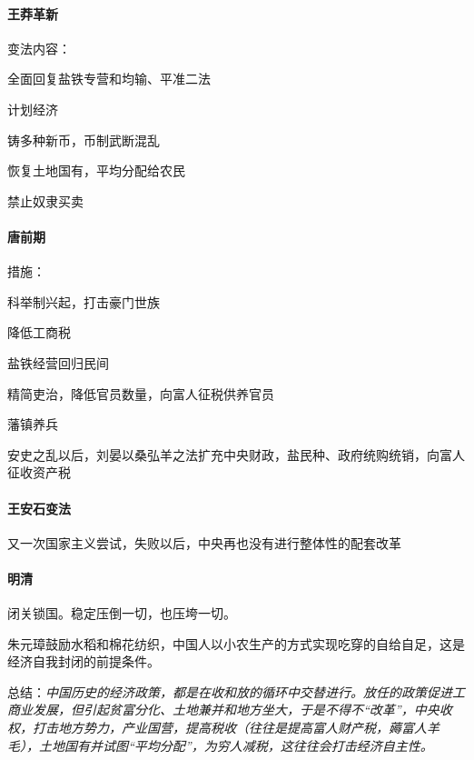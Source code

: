 \paragraph{王莽革新}

变法内容：
\begin{itemize*}
	\item 全面回复盐铁专营和均输、平准二法
	\item 计划经济
	\item 铸多种新币，币制武断混乱
	\item 恢复土地国有，平均分配给农民
	\item 禁止奴隶买卖
\end{itemize*}

\paragraph{唐前期}

措施：
\begin{itemize*}
	\item 科举制兴起，打击豪门世族
	\item 降低工商税
	\item 盐铁经营回归民间
	\item 精简吏治，降低官员数量，向富人征税供养官员
	\item 藩镇养兵
\end{itemize*}
安史之乱以后，刘晏以桑弘羊之法扩充中央财政，盐民种、政府统购统销，向富人征收资产税

\paragraph{王安石变法}

又一次国家主义尝试，失败以后，中央再也没有进行整体性的配套改革

\paragraph{明清}

闭关锁国。稳定压倒一切，也压垮一切。

朱元璋鼓励水稻和棉花纺织，中国人以小农生产的方式实现吃穿的自给自足，这是经济自我封闭的前提条件。

总结：\emph{中国历史的经济政策，都是在收和放的循环中交替进行。放任的政策促进工商业发展，但引起贫富分化、土地兼并和地方坐大，于是不得不“改革”，中央收权，打击地方势力，产业国营，提高税收（往往是提高富人财产税，薅富人羊毛），土地国有并试图“平均分配”，为穷人减税，这往往会打击经济自主性。}

